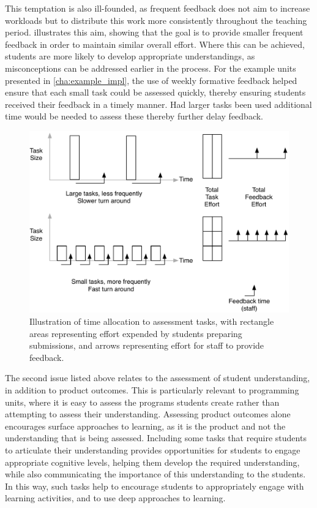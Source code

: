 This temptation is also ill-founded, as frequent feedback does not aim to increase workloads but to distribute this work more consistently throughout the teaching period.  illustrates this aim, showing that the goal is to provide smaller frequent feedback in order to maintain similar overall effort. Where this can be achieved, students are more likely to develop appropriate understandings, as misconceptions can be addressed earlier in the process. For the example units presented in \cref{cha:example_impl}, the use of weekly formative feedback helped ensure that each small task could be assessed quickly, thereby ensuring students received their feedback in a timely manner. Had larger tasks been used additional time would be needed to assess these thereby further delay feedback.

\begin{figure}[htbp]
	\centering
	\includegraphics[width=\textwidth]{FormativeFeedback}
	\caption{Illustration of time allocation to assessment tasks, with rectangle areas representing effort expended by students preparing submissions, and arrows representing effort for staff to provide feedback.}
	\label{fig:formative_feedback}
\end{figure}

The second issue listed above relates to the assessment of student understanding, in addition to product outcomes. This is particularly relevant to programming units, where it is easy to assess the programs students create rather than attempting to assess their understanding. Assessing product outcomes alone encourages surface approaches to learning, as it is the product and not the understanding that is being assessed. Including some tasks that require students to articulate their understanding provides opportunities for students to engage appropriate cognitive levels, helping them develop the required understanding, while also communicating the importance of this understanding to the students. In this way, such tasks help to encourage students to appropriately engage with learning activities, and to use deep approaches to learning.

